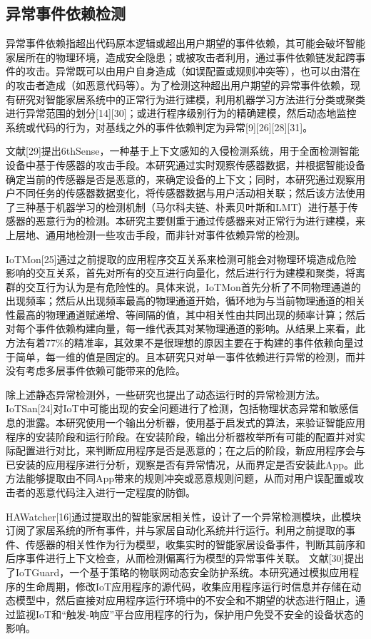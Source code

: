 \subsection{异常事件依赖检测}

异常事件依赖指超出代码原本逻辑或超出用户期望的事件依赖，其可能会破坏智能家居所在的物理环境，造成安全隐患；或被攻击者利用，通过事件依赖链发起跨事件的攻击。异常既可以由用户自身造成（如误配置或规则冲突等），也可以由潜在的攻击者造成（如恶意代码等）。为了检测这种超出用户期望的异常事件依赖，现有研究对智能家居系统中的正常行为进行建模，利用机器学习方法进行分类或聚类进行异常范围的划分[14][30]；或进行程序级别行为的精确建模，然后动态地监控系统或代码的行为，对基线之外的事件依赖判定为异常[9][26][28][31]。

文献[29]提出6thSense，一种基于上下文感知的入侵检测系统，用于全面检测智能设备中基于传感器的攻击手段。本研究通过实时观察传感器数据，并根据智能设备确定当前的传感器是否是恶意的，来确定设备的上下文；同时，本研究通过观察用户不同任务的传感器数据变化，将传感器数据与用户活动相关联；然后该方法使用了三种基于机器学习的检测机制（马尔科夫链、朴素贝叶斯和LMT）进行基于传感器的恶意行为的检测。本研究主要侧重于通过传感器来对正常行为进行建模，来上层地、通用地检测一些攻击手段，而非针对事件依赖异常的检测。

IoTMon[25]通过之前提取的应用程序交互关系来检测可能会对物理环境造成危险影响的交互关系，首先对所有的交互进行向量化，然后进行行为建模和聚类，将离群的交互行为认为是有危险性的。具体来说，IoTMon首先分析了不同物理通道的出现频率；然后从出现频率最高的物理通道开始，循环地为与当前物理通道的相关性最高的物理通道赋递增、等间隔的值，其中相关性由共同出现的频率计算；然后对每个事件依赖构建向量，每一维代表其对某物理通道的影响。从结果上来看，此方法有着77\%的精准率，其效果不是很理想的原因主要在于构建的事件依赖向量过于简单，每一维的值是固定的。且本研究只对单一事件依赖进行异常的检测，而并没有考虑多层事件依赖可能带来的危险。

除上述静态异常检测外，一些研究也提出了动态运行时的异常检测方法。IoTSan[24]对IoT中可能出现的安全问题进行了检测，包括物理状态异常和敏感信息的泄露。本研究使用一个输出分析器，使用基于启发式的算法，来验证智能应用程序的安装阶段和运行阶段。在安装阶段，输出分析器枚举所有可能的配置并对实际配置进行对比，来判断应用程序是否是恶意的；在之后的阶段，新应用程序会与已安装的应用程序进行分析，观察是否有异常情况，从而界定是否安装此App。此方法能够提取由不同App带来的规则冲突或恶意规则问题，从而对用户误配置或攻击者的恶意代码注入进行一定程度的防御。

HAWatcher[16]通过提取出的智能家居相关性，设计了一个异常检测模块，此模块订阅了家居系统的所有事件，并与家居自动化系统并行运行。利用之前提取的事件、传感器的相关性作为行为模型，收集实时的智能家居设备事件，判断其前序和后序事件进行上下文检查，从而检测偏离行为模型的异常事件关联。
文献[30]提出了IoTGuard，一个基于策略的物联网动态安全防护系统。本研究通过模拟应用程序的生命周期，修改IoT应用程序的源代码，收集应用程序运行时信息并存储在动态模型中，然后直接对应用程序运行环境中的不安全和不期望的状态进行阻止，通过监视IoT和“触发-响应”平台应用程序的行为，保护用户免受不安全的设备状态的影响。

